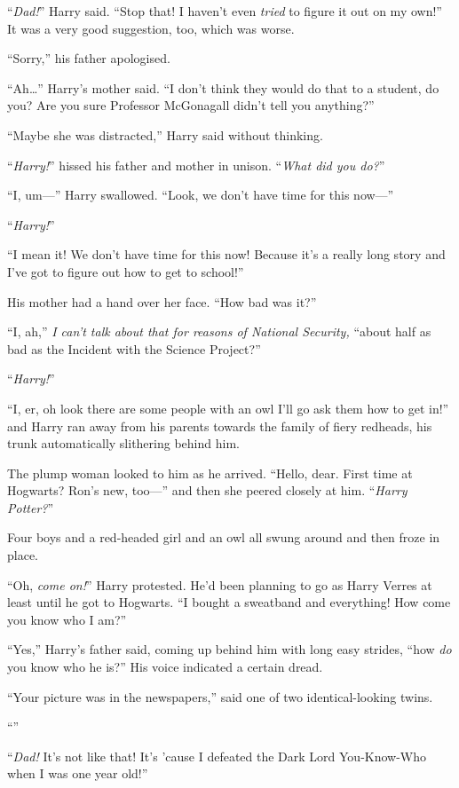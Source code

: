 “\emph{Dad!}” Harry said. “Stop that! I haven’t even \emph{tried} to figure it out on my own!” It was a very good suggestion, too, which was worse.

“Sorry,” his father apologised.

“Ah…” Harry’s mother said. “I don’t think they would do that to a student, do you? Are you sure Professor McGonagall didn’t tell you anything?”

“Maybe she was distracted,” Harry said without thinking.

“\emph{Harry!}” hissed his father and mother in unison. “\emph{What did you do?}”

“I, um—” Harry swallowed. “Look, we don’t have time for this now—”

“\emph{Harry!}”

“I mean it! We don’t have time for this now! Because it’s a really long story and I’ve got to figure out how to get to school!”

His mother had a hand over her face. “How bad was it?”

“I, ah,” \emph{I can’t talk about that for reasons of National Security,} “about half as bad as the Incident with the Science Project?”

“\emph{Harry!}”

“I, er, oh look there are some people with an owl I’ll go ask them how to get in!” and Harry ran away from his parents towards the family of fiery redheads, his trunk automatically slithering behind him.

The plump woman looked to him as he arrived. “Hello, dear. First time at Hogwarts? Ron’s new, too—” and then she peered closely at him. “\emph{Harry Potter?}”

Four boys and a red-headed girl and an owl all swung around and then froze in place.

“Oh, \emph{come on!}” Harry protested. He’d been planning to go as Harry Verres at least until he got to Hogwarts. “I bought a sweatband and everything! How come you know who I am?”

“Yes,” Harry’s father said, coming up behind him with long easy strides, “how \emph{do} you know who he is?” His voice indicated a certain dread.

“Your picture was in the newspapers,” said one of two identical-looking twins.

“”

“\emph{Dad!} It’s not like that! It’s ’cause I defeated the Dark Lord You-Know-Who when I was one year old!”

